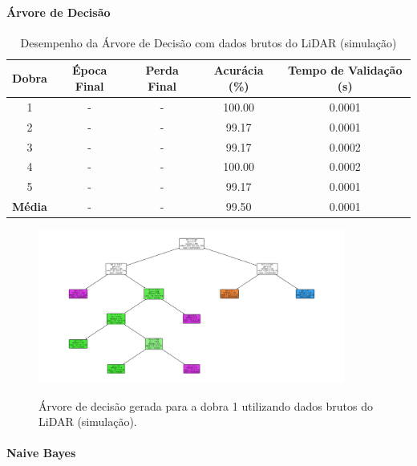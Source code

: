\paragraph{Árvore de Decisão}

\begin{table}[H]
\centering
\caption{Desempenho da Árvore de Decisão com dados brutos do LiDAR (simulação)}
\label{tab:arvore_lidar_sim}
\begin{tabular}{ccccc}
\hline
\textbf{Dobra} & \textbf{Época Final} & \textbf{Perda Final} & \textbf{Acurácia (\%)} & \textbf{Tempo de Validação (s)} \\
\hline
1 & -  & -      & 100.00 & 0.0001 \\
2 & -  & -      & 99.17  & 0.0001 \\
3 & -  & -      & 99.17  & 0.0002 \\
4 & -  & -      & 100.00 & 0.0002 \\
5 & -  & -      & 99.17  & 0.0001 \\
\hline
\textbf{Média} & - & - & 99.50 & 0.0001 \\
\hline
\end{tabular} \fonte{}
\end{table}

\begin{figure}[H]
\caption{Árvore de decisão gerada para a dobra 1 utilizando dados brutos do LiDAR (simulação).}
\includegraphics[width=0.9\textwidth]{figuras/Resultados/simu_principal_Teste2_arvore.png}
\fonte{}
\label{fig:arvore_decisao_dobra1}
\end{figure}


\paragraph{Naive Bayes}


